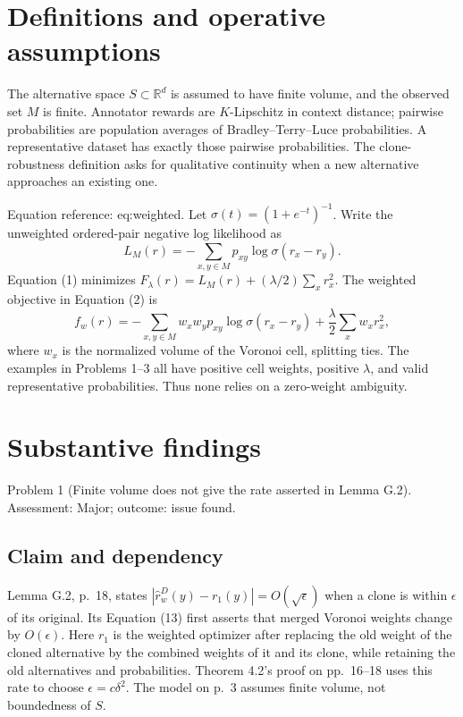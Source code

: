 \documentclass[10pt]{article}
\begin{document}
\section*{Definitions and operative assumptions}
The alternative space \(S\subset\mathbb R^d\) is assumed to have finite volume, and the observed set \(M\) is finite. Annotator rewards are \(K\)-Lipschitz in context distance; pairwise probabilities are population averages of Bradley–Terry–Luce probabilities. A representative dataset has exactly those pairwise probabilities. The clone-robustness definition asks for qualitative continuity when a new alternative approaches an existing one.\par
Equation reference: eq:weighted. Let \(\sigma(t)=(1+e^{-t})^{-1}\). Write the unweighted ordered-pair negative log likelihood as \[L_M(r)=-\sum_{x,y\in M}p_{xy}\log\sigma(r_x-r_y).\] Equation (1) minimizes \(F_\lambda(r)=L_M(r)+(\lambda/2)\sum_xr_x^2\). The weighted objective in Equation (2) is \[
 f_w(r)=-\sum_{x,y\in M}w_xw_yp_{xy}\log\sigma(r_x-r_y)
       +\frac{\lambda}{2}\sum_xw_xr_x^2,\] where \(w_x\) is the normalized volume of the Voronoi cell, splitting ties. The examples in Problems 1–3 all have positive cell weights, positive \(\lambda\), and valid representative probabilities. Thus none relies on a zero-weight ambiguity.\par
\section*{Substantive findings}
Problem 1 (Finite volume does not give the rate asserted in Lemma G.2).  Assessment: Major; outcome: issue found.\par
\subsection*{Claim and dependency}
Lemma G.2, p. 18, states \(|\widehat r_w^D(y)-r_1(y)|=O(\sqrt\epsilon)\) when a clone is within \(\epsilon\) of its original. Its Equation (13) first asserts that merged Voronoi weights change by \(O(\epsilon)\). Here \(r_1\) is the weighted optimizer after replacing the old weight of the cloned alternative by the combined weights of it and its clone, while retaining the old alternatives and probabilities. Theorem 4.2’s proof on pp. 16–18 uses this rate to choose \(\epsilon=c\delta^2\). The model on p. 3 assumes finite volume, not boundedness of \(S\).\par
\end{document}
